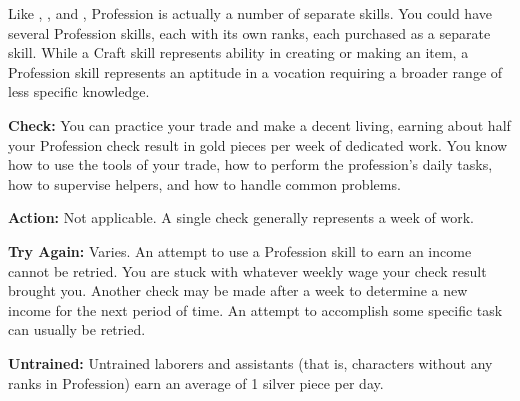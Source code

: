 
Like , , and , Profession is actually a number of separate 
skills. You could have several Profession skills, each with its own ranks, each 
purchased as a separate skill. While a Craft skill represents ability in creating 
or making an item, a Profession skill represents an aptitude in a vocation requiring 
a broader range of less specific knowledge. 

\textbf{Check:} You can practice your trade and make a decent living, earning about 
half your Profession check result in gold pieces per week of dedicated work. You 
know how to use the tools of your trade, how to perform the profession's daily 
tasks, how to supervise helpers, and how to handle common problems.

\textbf{Action:} Not applicable. A single check generally represents a week of 
work.

\textbf{Try Again:} Varies. An attempt to use a Profession skill to earn an income 
cannot be retried. You are stuck with whatever weekly wage your check result brought 
you. Another check may be made after a week to determine a new income for the next 
period of time. An attempt to accomplish some specific task can usually be retried.

\textbf{Untrained:} Untrained laborers and assistants (that is, characters without 
any ranks in Profession) earn an average of 1 silver piece per day.
